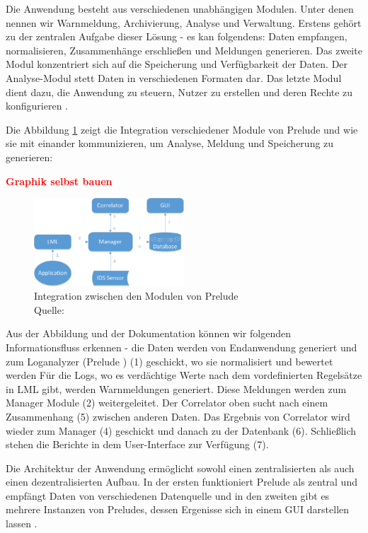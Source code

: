 Die Anwendung besteht aus verschiedenen unabhängigen Modulen. Unter denen nennen wir Warnmeldung, Archivierung, Analyse und Verwaltung. Erstens gehört zu der zentralen Aufgabe dieser Lösung - es kan folgendens: Daten empfangen, normalisieren, Zusammenhänge erschließen und Meldungen generieren. Das zweite Modul  konzentriert sich auf die Speicherung und Verfügbarkeit der Daten. Der Analyse-Modul stett Daten in verschiedenen Formaten dar. Das letzte Modul dient dazu, die Anwendung zu steuern, Nutzer zu erstellen und deren Rechte zu konfigurieren \citep{EC_Prelude}. 

\newpage
Die Abbildung \ref{fig:Module_preludes} zeigt die Integration verschiedener Module von Prelude und wie sie mit einander kommunizieren, um Analyse, Meldung und Speicherung zu generieren:

\textbf{\textcolor{red}{Graphik selbst bauen}}

\begin{figure}[H]
   \centering
   \includegraphics[width=0.5\textwidth]{assets/2_p3.png}
   \caption[Integration zwischen den Modulen von Prelude ]
   {Integration zwischen den Modulen von Prelude \\Quelle: \citep{Prelude_MU} }
   \label{fig:Module_preludes}
   \centering
\end{figure}

Aus der Abbildung und der Dokumentation können wir folgenden Informationsfluss erkennen - die Daten werden von Endanwendung generiert und zum Loganalyzer (Prelude ) (1) geschickt, wo sie normalisiert und bewertet werden Für die Logs, wo es verdächtige Werte nach dem vordefinierten Regelsätze in \gls{LML} gibt, werden Warnmeldungen generiert. Diese Meldungen werden zum Manager Module (2) weitergeleitet. Der Correlator oben sucht nach einem Zusammenhang (5) zwischen anderen Daten. Das Ergebnis von Correlator wird wieder zum Manager (4) geschickt und danach zu der Datenbank (6). Schließlich stehen die Berichte in dem User-Interface zur Verfügung (7)\citep{Prelude_Doc}.

Die Architektur der Anwendung ermöglicht sowohl einen zentralisierten als auch einen dezentralisierten Aufbau. In der ersten funktioniert Prelude als zentral und empfängt Daten von verschiedenen Datenquelle und in den zweiten gibt es mehrere Instanzen von Preludes, dessen Ergenisse sich in einem \gls{GUI} darstellen lassen \citep{Prelude_MU}. 

